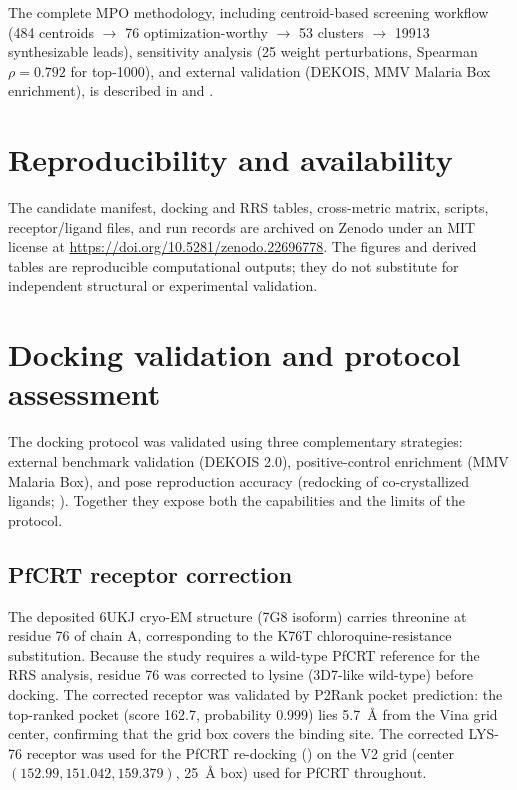 \documentclass[11pt,a4paper]{article}
\begin{document}
	The complete MPO methodology, including centroid-based screening workflow (\num{484} centroids $\rightarrow$ \num{76} optimization-worthy $\rightarrow$ \num{53} clusters $\rightarrow$ \num{19913} synthesizable leads), sensitivity analysis (\num{25} weight perturbations, Spearman $\rho = \num{0.792}$ for top-1000), and external validation (DEKOIS, MMV Malaria Box enrichment), is described in  and .
	
	\section{Reproducibility and availability}\label{sec:sm_repro}
	The candidate manifest, docking and RRS tables, cross-metric matrix, scripts, receptor/ligand files, and run records are archived on Zenodo under an MIT license at \url{https://doi.org/10.5281/zenodo.22696778}. The figures and derived tables are reproducible computational outputs; they do not substitute for independent structural or experimental validation.
	
	\section{Docking validation and protocol assessment}\label{sec:sm_validation}
	The docking protocol was validated using three complementary strategies: external benchmark validation (DEKOIS 2.0), positive-control enrichment (MMV Malaria Box), and pose reproduction accuracy (redocking of co-crystallized ligands; ). Together they expose both the capabilities and the limits of the protocol.
	
	\subsection{PfCRT receptor correction}\label{sec:sm_val_crt}
	The deposited 6UKJ cryo-EM structure (7G8 isoform) carries threonine at residue 76 of chain A, corresponding to the K76T chloroquine-resistance substitution. Because the study requires a wild-type PfCRT reference for the RRS analysis, residue 76 was corrected to lysine (3D7-like wild-type) before docking. The corrected receptor was validated by P2Rank pocket prediction: the top-ranked pocket (score 162.7, probability 0.999) lies \qty{5.7}{\angstrom} from the Vina grid center, confirming that the grid box covers the binding site. The corrected LYS-76 receptor was used for the PfCRT re-docking () on the V2 grid (center $(\num{152.99}, \num{151.042}, \num{159.379})$, \qty{25}{\angstrom} box) used for PfCRT throughout.
	
\end{document}
